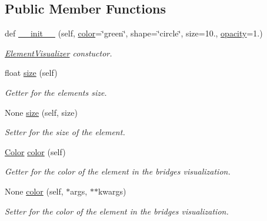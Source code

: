 \subsection*{Public Member Functions}
\begin{DoxyCompactItemize}
\item 
def \mbox{\hyperlink{classbridges_1_1element__visualizer_1_1_element_visualizer_a27ee5eddf78bac93e2702b2f2203518a}{\+\_\+\+\_\+init\+\_\+\+\_\+}} (self, \mbox{\hyperlink{classbridges_1_1element__visualizer_1_1_element_visualizer_a1fd985698e1c56289ed49fa7849d43ab}{color}}=\char`\"{}green\char`\"{}, shape=\char`\"{}circle\char`\"{}, size=10., \mbox{\hyperlink{classbridges_1_1element__visualizer_1_1_element_visualizer_aaa4463337cf50610f4ee230bcdf2e483}{opacity}}=1.)
\begin{DoxyCompactList}\small\item\em \mbox{\hyperlink{classbridges_1_1element__visualizer_1_1_element_visualizer}{Element\+Visualizer}} constuctor. \end{DoxyCompactList}\item 
float \mbox{\hyperlink{classbridges_1_1element__visualizer_1_1_element_visualizer_a4719523d913d90fc35aaa96bea674e65}{size}} (self)
\begin{DoxyCompactList}\small\item\em Getter for the elements size. \end{DoxyCompactList}\item 
None \mbox{\hyperlink{classbridges_1_1element__visualizer_1_1_element_visualizer_aa169210ab46d09ede9789910b844dd9e}{size}} (self, size)
\begin{DoxyCompactList}\small\item\em Setter for the size of the element. \end{DoxyCompactList}\item 
\mbox{\hyperlink{classbridges_1_1color_1_1_color}{Color}} \mbox{\hyperlink{classbridges_1_1element__visualizer_1_1_element_visualizer_a87d713b84157c9cb59d3185d9e364e17}{color}} (self)
\begin{DoxyCompactList}\small\item\em Getter for the color of the element in the bridges visualization. \end{DoxyCompactList}\item 
None \mbox{\hyperlink{classbridges_1_1element__visualizer_1_1_element_visualizer_a07fe381e92e2a62c7e62c425189d790e}{color}} (self, $\ast$args, $\ast$$\ast$kwargs)
\begin{DoxyCompactList}\small\item\em Setter for the color of the element in the bridges visualization. \end{DoxyCompactList}\item 
$$
\end{DoxyCompactItemize}
